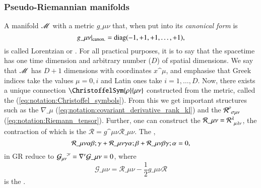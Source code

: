 \subsubsection{Pseudo-Riemannian manifolds}
A manifold $\mathscr{M}$ with a metric $g\_{\mu\nu}$ that, when put into its \emph{canonical form} is~\citep{carrollSpacetimeGeometryIntroduction2019}
\begin{equation}
    g\_{\mu\nu} \rvert_\mathrm{canon.} =  \text{diag}(-1,+1,+1, \dots,+1), 
\end{equation}
is called Lorentzian or . For all practical purposes, it is to say that the spacetime has one time dimension and arbitrary number ($D$) of spatial dimensions. We say that $\mathscr{M}$ has $D+1$ dimensions with coordinates $x\^\mu$, and emphasise that Greek indices take the values $\mu=0,i$ and Latin ones take $i = 1, \dots , D$. Now, there exists a unique connection $\ChristoffelSym{\rho}{\mu\nu}$ constructed from the metric, called the  (\cref{eq:notation:Christoffel_symbols}). From this we get important structures such as the  $\nabla\_\mu$ (\cref{eq:notation:covariant_derivative_rank_kl}) and the  $\mathcal{R}\indices{^\rho_{\sigma\mu\nu}}$ (\cref{eq:notation:Riemann_tensor}). Further, one can construct the  $\mathcal{R}\_{\mu\nu}  = \mathcal{R}\indices{^\lambda_{\mu\lambda\nu}}$, 
the contraction of which is the  $\mathcal{R}= g\^{\mu\nu} \mathcal{R}\_{\mu\nu}$. 
The ,~\citep{carrollSpacetimeGeometryIntroduction2019}
\begin{equation}\label{eq:GR:diffgeo:Bianchi_identities}
    \mathcal{R}\_{\mu\nu\alpha\beta;\gamma} + 
    \mathcal{R}\_{\mu\nu\gamma\alpha;\beta} + 
    \mathcal{R}\_{\mu\nu\beta\gamma;\alpha} = 0,
\end{equation}
in GR reduce to %
$\mathcal{G}\indices{_{\mu\nu}^{;\nu}}= \nabla\^\nu \mathcal{G}\_{\mu\nu}= 0$, where %
\begin{equation}\label{eq:GR:diffgeo:Einstein_tensor}
    \mathcal{G}\_{\mu\nu}= \mathcal{R}\_{\mu\nu} - \frac{1}{2} g\_{\mu\nu}  \mathcal{R}
\end{equation}
is the .%





